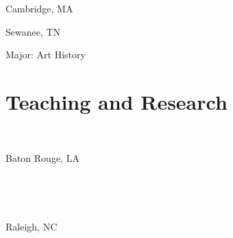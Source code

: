 \documentclass[]{baharmon_cv}
\renewcommand{\baselinestretch}{1.15}
\begin{document}
\begin{minipage}[t]{0.85\textwidth} 
\end{minipage}
\begin{minipage}[t]{0.20\textwidth} 
Cambridge, MA
\end{minipage}
\vspace*{0.1cm}

\begin{minipage}[t]{0.85\textwidth} 
\end{minipage}
\begin{minipage}[t]{0.15\textwidth} 
Sewanee, TN
\end{minipage}
Major: Art History
\vspace*{0.1cm}

\sectiondivider


\section{Teaching and Research}
\begin{minipage}[t]{0.85\textwidth}
\renewcommand{\baselinestretch}{1.75}
\\
\end{minipage}
\begin{minipage}[t]{0.15\textwidth} 
Baton Rouge, LA
\end{minipage}\\


\begin{minipage}[t]{0.85\textwidth}
\renewcommand{\baselinestretch}{1.75}
\\
\end{minipage}
\begin{minipage}[t]{0.15\textwidth} 
Raleigh, NC
\end{minipage}\\
\end{document}
